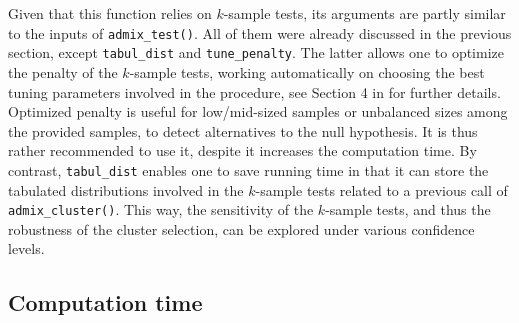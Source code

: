 Given that this function relies on \(k\)-sample tests, its arguments are partly similar to the inputs of \texttt{admix\_test()}. All of them were already discussed in the previous section, except \texttt{tabul\_dist} and \texttt{tune\_penalty}. The latter allows one to optimize the penalty of the \(k\)-sample tests, working automatically on choosing the best tuning parameters involved in the procedure, see Section 4 in \citep{Milhaud+Pommeret+Salhi+Vandekerkhove:2024b} for further details. Optimized penalty is useful for low/mid-sized samples or unbalanced sizes among the provided samples, to detect alternatives to the null hypothesis. It is thus rather recommended to use it, despite it increases the computation time. By contrast, \texttt{tabul\_dist} enables one to save running time in that it can store the tabulated distributions involved in the \(k\)-sample tests related to a previous call of \texttt{admix\_cluster()}. This way, the sensitivity of the \(k\)-sample tests, and thus the robustness of the cluster selection, can be explored under various confidence levels.

\subsection{Computation time}\label{computation-time}

